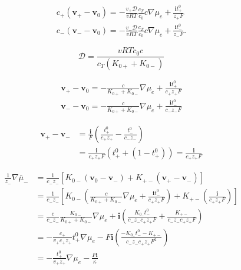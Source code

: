 \documentclass[lettersize,journal]{IEEEtran}
\begin{document}
\begin{equation}
\begin{array}{l}
c_{+}\left(\mathbf{v}_{+}-\mathbf{v}_{0}\right)=-\frac{v_{+} \mathscr{D}}{v R T} \frac{c_{T}}{c_{0}} c \nabla \mu_{e}+\frac{\mathbf{i} t_{+}^{0}}{z_{+} F} \\
c_{-}\left(\mathbf{v}_{-}-\mathbf{v}_{0}\right)=-\frac{v_{-} \mathscr{D}}{v R T} \frac{c_{T}}{c_{0}} c \nabla \mu_{e}+\frac{\mathbf{i} t_{-}^{0}}{z_{-} F} .
\end{array}
\end{equation}

\begin{equation}
\mathscr{D}=\frac{v R T c_{0} c}{c_{T}\left(K_{0+}+K_{0-}\right)}
\end{equation}

\begin{equation}
\begin{array}{l}
\mathbf{v}_{+}-\mathbf{v}_{0}=-\frac{c}{K_{0+}+K_{0-}} \nabla \mu_{e}+\frac{\mathbf{i} t_{+}^{0}}{c_{+} z_{+} F} \\
\mathbf{v}_{-}-\mathbf{v}_{0}=-\frac{c}{K_{0+}+K_{0-}} \nabla \mu_{e}+\frac{\mathbf{i} t_{-}^{0}}{c_{-} z_{-} F}
\end{array}
\end{equation}

\begin{equation}
\begin{aligned}
\mathbf{v}_{+}-\mathbf{v}_{-} &=\frac{\mathbf{i}}{F}\left(\frac{t_{+}^{0}}{c_{+} z_{+}}-\frac{t_{-}^{0}}{c_{-} z_{-}}\right) \\
&=\frac{\mathbf{i}}{c_{+} z_{+} F}\left(t_{+}^{0}+\left(1-t_{+}^{0}\right)\right)=\frac{\mathbf{i}}{c_{+} z_{+} F}
\end{aligned}
\end{equation}

\begin{equation}
\begin{aligned}
\frac{1}{z_{-}} \nabla \bar{\mu}_{-} &=\frac{1}{c_{-} z_{-}}\left[K_{0-}\left(\mathbf{v}_{0}-\mathbf{v}_{-}\right)+K_{+-}\left(\mathbf{v}_{+}-\mathbf{v}_{-}\right)\right] \\
&=\frac{1}{c_{-} z_{-}}\left[K_{0-}\left(\frac{c}{K_{0+}+K_{0-}} \nabla \mu_{e}+\frac{\mathbf{i} t_{-}^{0}}{c_{+} z_{+} F}\right)+K_{+-}\left(\frac{\mathbf{i}}{c_{+} z_{+} F}\right)\right] \\
&=\frac{c}{c_{-} z_{-}} \frac{K_{0-}}{K_{0+}+K_{0-}} \nabla \mu_{e}+\mathbf{i}\left(\frac{K_{0_{-}} t_{-}^{0}}{c_{-} z_{-} c_{+} z_{+} F}+\frac{K_{+-}}{c_{-} z_{-} c_{+} z_{+} F}\right) \\
&=-\frac{c_{+}}{v_{+} c_{+} z_{+}} t_{+}^{0} \nabla \mu_{e}-F \mathbf{i}\left(\frac{-K_{0_{-}} t_{-}^{0}-K_{+-}}{c_{-} z_{-} c_{+} z_{+} F^{2}}\right) \\
&=-\frac{t_{+}^{0}}{v_{+} z_{+}} \nabla \mu_{e}-\frac{F \mathbf{i}}{\kappa}
\end{aligned}
\end{equation}
\end{document}

